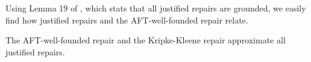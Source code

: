Using Lemma 19 of \citet{iclp/Cruz-Filipe16}, which stats that all justified repairs are grounded, we easily find how justified repairs and the AFT-well-founded repair relate. 




\begin{corollary}
 The AFT-well-founded repair and the Kripke-Kleene repair approximate all justified repairs. 
\end{corollary}


